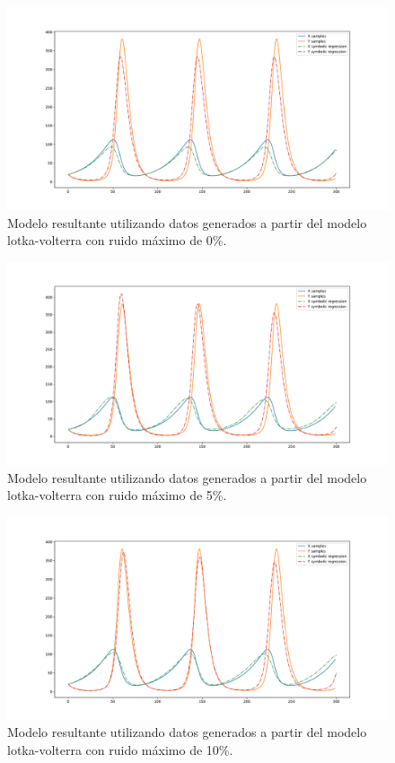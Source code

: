 \begin{figure}[h]
    \centering
    \includegraphics[width=\textwidth]{"figures/final_plot_LV_0.0.pdf"}
    \caption{Modelo resultante utilizando datos generados a partir del modelo lotka-volterra con ruido máximo de 0\%.}
    \label{fig:final_plot_LV_0.0}
\end{figure}

\begin{figure}[h]
    \centering
    \includegraphics[width=\textwidth]{"figures/final_plot_LV_0.05.pdf"}
    \caption{Modelo resultante utilizando datos generados a partir del modelo lotka-volterra con ruido máximo de 5\%.}
    \label{fig:final_plot_LV_0.05}
\end{figure}

\begin{figure}[h]
    \centering
    \includegraphics[width=\textwidth]{"figures/final_plot_LV_0.1.pdf"}
    \caption{Modelo resultante utilizando datos generados a partir del modelo lotka-volterra con ruido máximo de 10\%.}
    \label{fig:final_plot_LV_0.1}
\end{figure}


